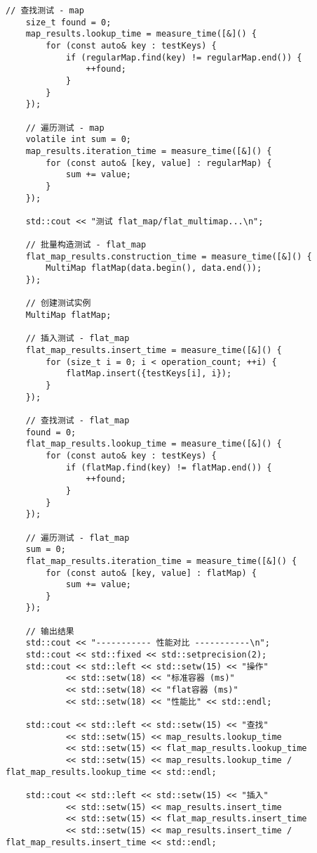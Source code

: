 \documentclass[a4paper, 12pt]{article}
\begin{document}
\begin{lstlisting}[style=cpp]
    // 查找测试 - map
    size_t found = 0;
    map_results.lookup_time = measure_time([&]() {
        for (const auto& key : testKeys) {
            if (regularMap.find(key) != regularMap.end()) {
                ++found;
            }
        }
    });
    
    // 遍历测试 - map
    volatile int sum = 0;
    map_results.iteration_time = measure_time([&]() {
        for (const auto& [key, value] : regularMap) {
            sum += value;
        }
    });
    
    std::cout << "测试 flat_map/flat_multimap...\n";
    
    // 批量构造测试 - flat_map
    flat_map_results.construction_time = measure_time([&]() {
        MultiMap flatMap(data.begin(), data.end());
    });
    
    // 创建测试实例
    MultiMap flatMap;
    
    // 插入测试 - flat_map
    flat_map_results.insert_time = measure_time([&]() {
        for (size_t i = 0; i < operation_count; ++i) {
            flatMap.insert({testKeys[i], i});
        }
    });
    
    // 查找测试 - flat_map
    found = 0;
    flat_map_results.lookup_time = measure_time([&]() {
        for (const auto& key : testKeys) {
            if (flatMap.find(key) != flatMap.end()) {
                ++found;
            }
        }
    });
    
    // 遍历测试 - flat_map
    sum = 0;
    flat_map_results.iteration_time = measure_time([&]() {
        for (const auto& [key, value] : flatMap) {
            sum += value;
        }
    });

    // 输出结果
    std::cout << "----------- 性能对比 -----------\n";
    std::cout << std::fixed << std::setprecision(2);
    std::cout << std::left << std::setw(15) << "操作" 
            << std::setw(18) << "标准容器 (ms)" 
            << std::setw(18) << "flat容器 (ms)" 
            << std::setw(18) << "性能比" << std::endl;
            
    std::cout << std::left << std::setw(15) << "查找" 
            << std::setw(15) << map_results.lookup_time
            << std::setw(15) << flat_map_results.lookup_time
            << std::setw(15) << map_results.lookup_time / flat_map_results.lookup_time << std::endl;
            
    std::cout << std::left << std::setw(15) << "插入" 
            << std::setw(15) << map_results.insert_time
            << std::setw(15) << flat_map_results.insert_time
            << std::setw(15) << map_results.insert_time / flat_map_results.insert_time << std::endl;
            

\end{lstlisting}
\end{document}
